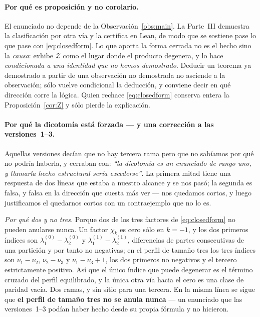 \documentclass[11pt,a4paper]{article}
\begin{document}
\paragraph{Por qu\'e es proposici\'on y no corolario.} El enunciado no depende de la
Observaci\'on~\ref{obs:main}. La Parte~III demuestra la clasificaci\'on por otra v\'ia y la
certifica en Lean, de modo que se sostiene pase lo que pase con \eqref{eq:closedform}. Lo que
aporta la forma cerrada no es el hecho sino la \emph{causa}: exhibe $\mathcal Z$ como el lugar
donde el producto degenera, y lo hace \emph{condicionada a una identidad que no hemos
demostrado}. Deducir un teorema ya demostrado a partir de una observaci\'on no demostrada no
asciende a la observaci\'on; s\'olo vuelve condicional la deducci\'on, y conviene decir en
qu\'e direcci\'on corre la l\'ogica. Quien rechace \eqref{eq:closedform} conserva entera la
Proposici\'on~\ref{cor:Z} y s\'olo pierde la explicaci\'on.

\paragraph{Por qu\'e la dicotom\'ia est\'a forzada --- y una correcci\'on a las versiones~1--3.}
Aquellas versiones dec\'ian que no hay tercera rama pero que no sab\'iamos por qu\'e no podr\'ia
haberla, y cerraban con: \emph{``la dicotom\'ia es un enunciado de rango uno, y llamarla hecho
estructural ser\'ia excederse''}. La primera mitad tiene una respuesta de dos l\'ineas que
estaba a nuestro alcance y se nos pas\'o; la segunda es falsa, y falsa en la direcci\'on que
cuesta m\'as ver --- nos quedamos cortos, y luego justificamos el quedarnos cortos con un
contraejemplo que no lo es.

\emph{Por qu\'e dos y no tres.} Porque dos de los tres factores de \eqref{eq:closedform} no
pueden anularse nunca. Un factor $\chi_k$ es cero s\'olo en $k=-1$, y los dos primeros \'indices
son $\lambda^{(0)}_1-\lambda^{(0)}_2$ y $\lambda^{(1)}_1-\lambda^{(1)}_2$, diferencias de partes
consecutivas de una partici\'on y por tanto no negativas; en el perfil de tama\~no tres los tres
\'indices son $\nu_1-\nu_2$, $\nu_2-\nu_3$ y $\nu_1-\nu_3+1$, los dos primeros no negativos y el
tercero estrictamente positivo. As\'i que el \'unico \'indice que puede degenerar es el t\'ermino
cruzado del perfil equilibrado, y la \'unica otra v\'ia hacia el cero es una clase de paridad
vac\'ia. Dos ramas, y sin sitio para una tercera. En la misma l\'inea se sigue que \textbf{el
perfil de tama\~no tres no se anula nunca} --- un enunciado que las versiones~1--3 pod\'ian haber
hecho desde su propia f\'ormula y no hicieron.
\end{document}
